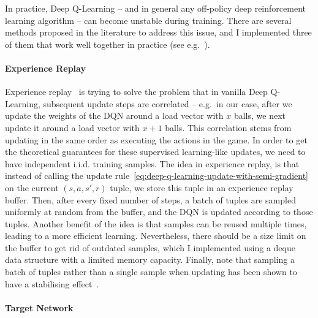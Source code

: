 In practice, Deep Q-Learning -- and in general any off-policy deep reinforcement learning algorithm -- can become unstable during training. There are several methods proposed in the literature to address this issue, and I implemented three of them that work well together in practice (see e.g.~\cite{mnih2015dqnstabilitycombined}).


\paragraph{Experience Replay}

Experience replay~\cite{lin1992experiencereplay} is trying to solve the problem that in vanilla Deep Q-Learning, subsequent update steps are correlated -- e.g.\  in our case, after we update the weights of the DQN around a load vector with $x$ balls, we next update it around a load vector with $x+1$ balls. This correlation stems from updating in the same order as executing the actions in the game. In order to get the theoretical guarantees for these supervised learning-like updates, we need to have independent i.i.d. training samples. The idea in experience replay, is that instead of calling the update rule~\ref{eq:deep-q-learning-update-with-semi-gradient} on the current $(s, a, s', r)$ tuple, we store this tuple in an experience replay buffer. Then, after every fixed number of steps, a batch of tuples are sampled uniformly at random from the buffer, and the DQN is updated according to those tuples. Another benefit of the idea is that samples can be reused multiple times, leading to a more efficient learning. Nevertheless, there should be a size limit on the buffer to get rid of outdated samples, which I implemented using a deque data structure with a limited memory capacity. Finally, note that sampling a batch of tuples rather than a single sample when updating has been shown to have a stabilising effect~\cite{qian2020batchingsgd}.


\paragraph{Target Network}


